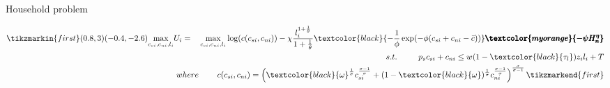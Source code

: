 \documentclass[11pt,aspectratio=169]{beamer}
\newcommand{\tr}[1]{\textcolor{blue}{#1}}
\begin{document}
	
	\addtocounter{framenumber}{-1}
	\begin{frame}{Household problem} %
		\vspace{2mm}
		\begin{minipage}[t!]{1\textwidth}
			\begin{align*}
			\tikzmarkin{first}(0.8,3)(-0.4,-2.6)
			\underset{c_{si},c_{ni}, l_i}{\max} U_i=\ \hspace{2mm} \underset{c_{si},c_{ni}, l_i}{\max} \log(c(c_{si},c_{ni}))-\chi\frac{l_i^{1+\frac{1}{\theta}}}{1+\frac{1}{\theta}}  \textcolor{black}{-\frac{1}{\phi}\exp(-\phi(c_{si}+c_{ni}-\bar{c}))}\pmb{\textcolor{myorange}{ -\psi H_n^\eta}}\\ 
			s.t.\ \hspace{6mm}  \hspace{2mm }p_{s}c_{si}+c_{ni}\leq w(1-\textcolor{black}{\tau_l})z_il_i+T%
			\\\hspace{-10mm} where \hspace{8mm}c(c_{si},c_{ni}) =
			\left(\textcolor{black}{\omega}^{\frac{1}{\sigma}}c_{si}^{\frac{\sigma-1}{\sigma}}+(1-\textcolor{black}{\omega})^{\frac{1}{\sigma}}c_{ni}^{\frac{\sigma-1}{\sigma}}\right)^{\frac{\sigma}{\sigma-1}}%
			\tikzmarkend{first}
			\end{align*}
		\end{minipage}
		
		

\end{frame}
\end{document}
